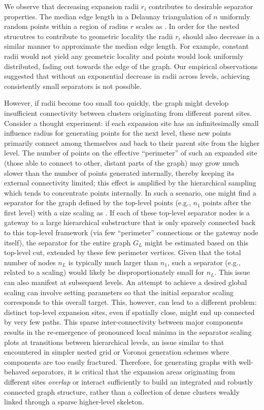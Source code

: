 We observe that decreasing expansion radii \(r_i\) contributes to desirable separator properties.
The median edge length in a Delaunay triangulation of \(n\) uniformly random points within a region of radius \(r\) scales as .
In order for the nested strucutres to contribute to geometric locality the radii \(r_i\) should also decrease in a similar manner to approximate the median edge length.
For example, constant radii would not yield any geometric locality and points would look uniformly distributed, fading out towards the edge of the graph.
Our empirical observations suggested that without an exponential decrease in radii across levels, achieving consistently small separators is not possible.

However, if radii become too small too quickly, the graph might develop insufficient connectivity between clusters originating from different parent sites.
Consider a thought experiment: if each expansion site has an infinitesimally small influence radius for generating points for the next level, these new points primarily connect among themselves and back to their parent site from the higher level.
The number of points on the effective \enquote{perimeter} of such an expanded site (those able to connect to other, distant parts of the graph) may grow much slower than the number of points generated internally, thereby keeping its external connectivity limited; this effect is amplified by the hierarchical sampling which tends to concentrate points internally.
In such a scenario, one might find a separator for the graph defined by the top-level points (e.g., \(n_1\) points after the first level) with a size scaling as .
If each of these top-level separator nodes is a gateway to a large hierarchical substructure that is only sparsely connected back to this top-level framework (via few \enquote{perimeter} connections or the gateway node itself), the separator for the entire graph \(G_L\) might be estimated based on this top-level cut, extended by these few perimeter vertices.
Given that the total number of nodes \(n_L\) is typically much larger than \(n_1\), such a separator (e.g., related to a  scaling) would likely be disproportionately small for \(n_L\).
This issue can also manifest at subsequent levels.
An attempt to achieve a desired global  scaling can involve setting parameters so that the initial  separator scaling corresponds to this overall target.
This, however, can lead to a different problem: distinct top-level expansion sites, even if spatially close, might end up connected by very few paths.
This sparse inter-connectivity between major components results in the re-emergence of pronounced local minima in the separator scaling plots at transitions between hierarchical levels, an issue similar to that encountered in simpler nested grid or Voronoi generation schemes where components are too easily fractured.
Therefore, for generating graphs with well-behaved separators, it is critical that the expansion areas originating from different sites \emph{overlap} or interact sufficiently to build an integrated and robustly connected graph structure, rather than a collection of dense clusters weakly linked through a sparse higher-level skeleton.

